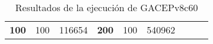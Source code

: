 \begin{table}[H]
\begin{tabular}{|ccrccrccc}
\multicolumn{1}{|c|}{\multirow{-39}{*}{\cellcolor[HTML]{FFFFC7}\textbf{100}}} & \multicolumn{1}{c|}{\multirow{-9}{*}{\cellcolor[HTML]{DDFDFF}100}} & \multicolumn{1}{r|}{\cellcolor[HTML]{DAE8FC}116654}    & \multicolumn{1}{c|}{\multirow{-39}{*}{\cellcolor[HTML]{FFFFC7}\textbf{200}}} & \multicolumn{1}{c|}{\multirow{-10}{*}{\cellcolor[HTML]{DDFDFF}100}} & \multicolumn{1}{r|}{\cellcolor[HTML]{DDFDFF}540962}    &                                                                              &                                                                    &                                                        \\ \cline{1-6}
\end{tabular}
\caption{\label{res:GACEPv8c60}Resultados de la ejecución de GACEPv8c60}
\end{table}


